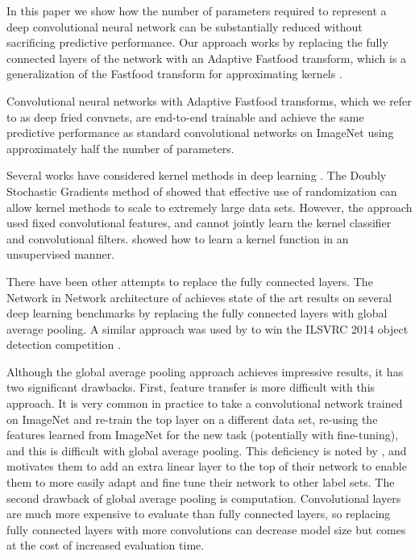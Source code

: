 \documentclass[10pt,twocolumn,letterpaper]{article}
\begin{document}
In this paper we show how the number of parameters required to represent a deep
convolutional neural network can be substantially reduced without sacrificing
predictive performance.  Our approach works by replacing the fully connected
layers of the network with an Adaptive Fastfood transform, which is a generalization of the Fastfood transform for approximating kernels 
 \cite{le:2013}.  

Convolutional neural networks with Adaptive Fastfood transforms, which we refer to as deep fried convnets, are end-to-end trainable and
achieve the same predictive performance as standard convolutional networks on
ImageNet using approximately half the number of parameters.  

Several works have considered kernel methods in deep learning
\cite{huang:2014,ChoS09,song:2014,mairal:2014}. 
The Doubly Stochastic Gradients method of \cite{song:2014} showed that
effective use of randomization can allow kernel methods to scale to extremely
large data sets. However, the approach used fixed
convolutional features, and cannot jointly learn the kernel classifier and
convolutional filters. \cite{mairal:2014} showed how to learn a kernel function
in an unsupervised manner. 

There have been other attempts to replace the fully connected layers. The Network in Network architecture of
\cite{Lin:2014:ICLR} achieves state of the art results on several deep learning
benchmarks by replacing the fully connected layers with global average pooling.
A similar approach was used by \cite{Szegedy2014} to win the ILSVRC 2014 object
detection competition \cite{Russakovsky2014}.

Although the global average pooling approach achieves impressive results, it
has two significant drawbacks. First, feature transfer is more difficult with
this approach. It is very common in practice to take a convolutional network
trained on ImageNet and re-train the top layer on a different data set,
re-using the features learned from ImageNet for the new task (potentially with
fine-tuning), and this is difficult with global average pooling. This
deficiency is noted by \cite{Szegedy2014}, and motivates them to add an extra
linear layer to the top of their network to enable them to more easily adapt
and fine tune their network to other label sets. The second drawback of global
average pooling is computation.  Convolutional layers are much more expensive
to evaluate than fully connected layers, so replacing fully connected layers
with more convolutions can decrease model size but comes at the cost of
increased evaluation time. 
\end{document}
